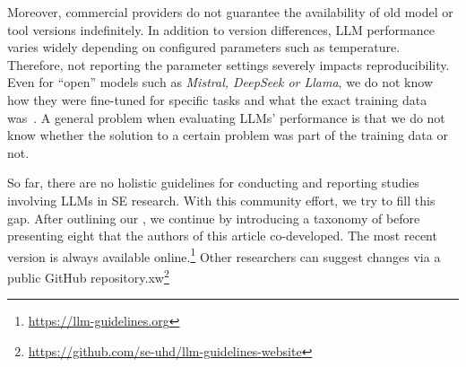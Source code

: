 Moreover, commercial providers do not guarantee the availability of old model or tool versions indefinitely.
In addition to version differences, LLM performance varies widely depending on configured parameters such as temperature.
Therefore, not reporting the parameter settings severely impacts reproducibility.
Even for ``open'' models such as \emph{Mistral, DeepSeek or Llama}, we do not know how they were fine-tuned for specific tasks and what the exact training data was~\cite{Gibney2024}.
A general problem when evaluating LLMs' performance is that we do not know whether the solution to a certain problem was part of the training data or not.

So far, there are no holistic guidelines for conducting and reporting studies involving LLMs in SE research.
With this community effort, we try to fill this gap.
After outlining our \scope, we continue by introducing a taxonomy of \studytypes before presenting eight \guidelines that the authors of this article co-developed.
The most recent version is always available online.\footnote{\url{https://llm-guidelines.org}}
Other researchers can suggest changes via a public GitHub repository.xw\footnote{\url{https://github.com/se-uhd/llm-guidelines-website}}
